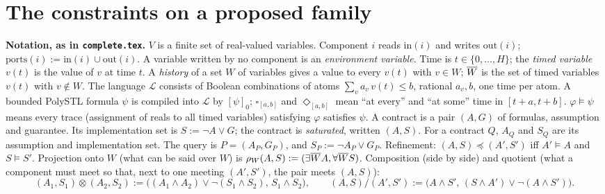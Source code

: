 \documentclass[10pt]{article}
\theoremstyle{tplain}\newtheorem{theorem}{Theorem}\newtheorem{lemma}[theorem]{Lemma}\newtheorem{proposition}[theorem]{Proposition}\newtheorem{corollary}[theorem]{Corollary}\newtheorem{claim}[theorem]{Claim}
\theoremstyle{tdef}\newtheorem{definition}[theorem]{Definition}
\newcommand{\inp}{\mathrm{in}}\newcommand{\outp}{\mathrm{out}}\newcommand{\ports}{\mathrm{ports}}
\begin{document}
\section{The constraints on a proposed family}
\textbf{Notation, as in \texttt{complete.tex}.} $V$ is a finite set of real-valued variables. Component $i$ reads $\inp(i)$ and writes $\outp(i)$; $\ports(i):=\inp(i)\cup\outp(i)$. A variable written by no component is an \emph{environment variable}. Time is $t\in\{0,\dots,H\}$; the \emph{timed variable} $v(t)$ is the value of $v$ at time $t$. A \emph{history} of a set $W$ of variables gives a value to every $v(t)$ with $v\in W$; $\overline{W}$ is the set of timed variables $v(t)$ with $v\notin W$. The language $\mathcal L$ consists of Boolean combinations of atoms $\sum_va_v\,v(t)\le b$, rational $a_v,b$, one time per atom. A bounded PolySTL formula $\psi$ is compiled into $\mathcal L$ by $[\psi]_0$; $\square_{[a,b]}$ and $\Diamond_{[a,b]}$ mean ``at every'' and ``at some'' time in $[t+a,t+b]$. $\varphi\models\psi$ means every trace (assignment of reals to all timed variables) satisfying $\varphi$ satisfies $\psi$. A contract is a pair $(A,G)$ of formulas, assumption and guarantee. Its implementation set is $S:=\neg A\vee G$; the contract is \emph{saturated}, written $(A,S)$. For a contract $Q$, $A_Q$ and $S_Q$ are its assumption and implementation set. The query is $P=(A_P,G_P)$, and $S_P:=\neg A_P\vee G_P$. Refinement: $(A,S)\preccurlyeq(A',S')$ iff $A'\models A$ and $S\models S'$. Projection onto $W$ (what can be said over $W$) is $\rho_W(A,S):=(\exists\overline{W} A,\forall\overline{W} S)$. Composition (side by side) and quotient (what a component must meet so that, next to one meeting $(A',S')$, the pair meets $(A,S)$):
\[(A_1,S_1)\otimes(A_2,S_2):=\big((A_1\wedge A_2)\vee\neg(S_1\wedge S_2),\,S_1\wedge S_2\big),\qquad (A,S)/(A',S'):=\big(A\wedge S',\,(S\wedge A')\vee\neg(A\wedge S')\big).\]
\end{document}
